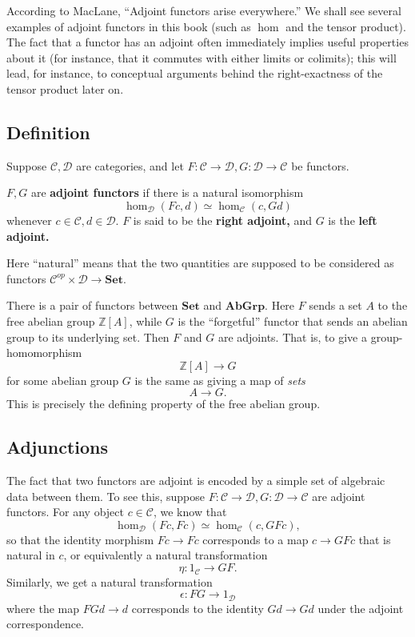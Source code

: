 According to MacLane, ``Adjoint functors arise everywhere.'' We shall see
several examples of adjoint functors in this book (such as $\hom$ and the
tensor product). The fact that a functor has an adjoint often immediately
implies useful properties about it (for instance, that it commutes with either
limits or colimits); this will lead, for instance, to conceptual arguments
behind the right-exactness of the tensor product later on.


\subsection{Definition}

Suppose $\mathcal{C}, \mathcal{D}$ are categories, and let $F: \mathcal{C} \to
\mathcal{D}, G: \mathcal{D} \to \mathcal{C}$ be functors.

\begin{definition} 
$F, G$ are \textbf{adjoint functors} if there is a natural isomorphism
\[ \hom_{\mathcal{D}}(Fc, d) \simeq \hom_{\mathcal{C}}(c, Gd)  \]
whenever $c \in \mathcal{C}, d \in \mathcal{D}$. $F$ is said to be the
\textbf{right adjoint,} and $G$ is the \textbf{left adjoint.}
\end{definition} 

Here ``natural'' means that the two quantities are supposed to be considered
as functors $\mathcal{C}^{op} \times \mathcal{D} \to \mathbf{Set}$.

\begin{example} 
There is a pair of functors between $\mathbf{Set}$ and $\mathbf{AbGrp}$. Here
$F$ sends  a set $A$ to the free abelian group $\mathbb{Z}[A]$, while $G$ is
the ``forgetful'' functor that sends an abelian group to its underlying set. 
Then $F$ and $G$ are adjoints. That is, to give a group-homomorphism
\[ \mathbb{Z}[A] \to G  \]
for some abelian group $G$ 
is the same as giving a map of \emph{sets}
\[ A \to G.  \]
This is precisely the defining property of the free abelian group.
\end{example} 


\subsection{Adjunctions}

The fact that two functors are adjoint is encoded by a simple set of algebraic
data between them. 
To see this, suppose $F: \mathcal{C} \to \mathcal{D}, G: \mathcal{D} \to \mathcal{C}$ are
adjoint functors. 
For any object $c \in \mathcal{C}$, we know that
\[ \hom_{\mathcal{D}}(Fc, Fc) \simeq \hom_{\mathcal{C}}(c, GF c),  \]
so that the identity morphism $Fc \to Fc$ corresponds to a map $c \to GFc$
that is natural in $c$, or equivalently a natural
transformation
\[ \eta: 1_{\mathcal{C}} \to GF. \]
Similarly, we get a natural transformation
\[ \epsilon:  FG \to 1_{\mathcal{D}}  \]
where the map $FGd \to d$ corresponds to the identity $Gd \to Gd$ under the
adjoint correspondence.

